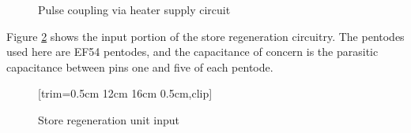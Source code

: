 \begin{figure}[ht]
	\centering
	\caption{Pulse coupling via heater supply circuit}
	\label{fig:store-regen-input-sch}
\end{figure}

Figure \ref{fig:store-regen-input} shows the input portion of the store regeneration circuitry. The pentodes used here are EF54 pentodes, and the capacitance of concern is the parasitic capacitance between pins one and five of each pentode.

\begin{figure}[ht]
	\centering
	[trim={0.5cm 12cm 16cm 0.5cm},clip] %
	\caption{Store regeneration unit input \cite{burton2014b}}
	\label{fig:store-regen-input}
\end{figure}

